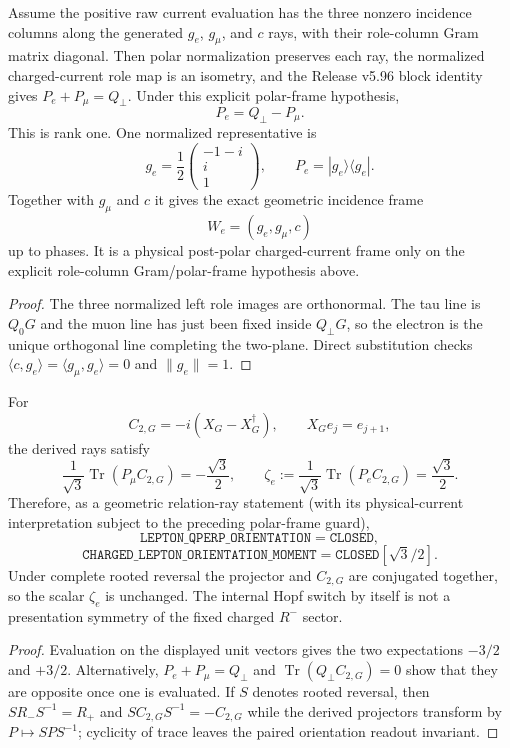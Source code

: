\documentclass[12pt,a4paper]{article}
\begin{document}
\begin{corollary}
\label{p6:cor:v597-electron-plane-ray}
Assume the positive raw current evaluation has the three nonzero incidence
columns along the generated $g_e$, $g_\mu$, and $c$ rays, with their
role-column Gram matrix diagonal. Then polar normalization preserves each
ray, the normalized charged-current role map is an isometry, and the
Release v5.96 block identity gives $P_e+P_\mu=Q_\perp$. Under this
explicit polar-frame hypothesis,
\[
 \boxed{P_e=Q_\perp-P_\mu.}
\]
This is rank one.  One normalized representative is
\[
 \boxed{g_e=\frac12
 \begin{pmatrix}-1-i\\ i\\1\end{pmatrix},
 \qquad P_e=|g_e\rangle\langle g_e|.}
\]
Together with $g_\mu$ and $c$ it gives the exact geometric incidence
frame
\[
 \boxed{W_e=(g_e,g_\mu,c)}
\]
up to phases. It is a physical post-polar charged-current frame only on
the explicit role-column Gram/polar-frame hypothesis above.
\end{corollary}
\begin{proof}
The three normalized left role images are orthonormal.  The tau line is $Q_0G$
and the muon line has just been fixed inside $Q_\perp G$, so the electron is
the unique orthogonal line completing the two-plane.  Direct substitution
checks $\langle c,g_e\rangle=\langle g_\mu,g_e\rangle=0$ and
$\|g_e\|=1$.
\end{proof}

\begin{corollary}
\label{p6:cor:v597-zeta-e-closure}
For
\[
 C_{2,G}=-i(X_G-X_G^\dagger),
 \qquad X_Ge_j=e_{j+1},
\]
the derived rays satisfy
\[
 \frac1{\sqrt3}\operatorname{Tr}(P_\mu C_{2,G})=-\frac{\sqrt3}{2},
 \qquad
 \boxed{\zeta_e:=\frac1{\sqrt3}\operatorname{Tr}(P_eC_{2,G})
 =\frac{\sqrt3}{2}.}
\]
Therefore, as a geometric relation-ray statement (with its physical-current
interpretation subject to the preceding polar-frame guard),
\[
 \boxed{\texttt{LEPTON\_QPERP\_ORIENTATION}=\texttt{CLOSED},}
\]
\[
 \boxed{\texttt{CHARGED\_LEPTON\_ORIENTATION\_MOMENT}
 =\texttt{CLOSED}[\sqrt3/2].}
\]
Under complete rooted reversal the projector and $C_{2,G}$ are conjugated
together, so the scalar $\zeta_e$ is unchanged.  The internal Hopf switch by
itself is not a presentation symmetry of the fixed charged $R^-$ sector.
\end{corollary}
\begin{proof}
Evaluation on the displayed unit vectors gives the two expectations
$-3/2$ and $+3/2$.  Alternatively, $P_e+P_\mu=Q_\perp$ and
$\operatorname{Tr}(Q_\perp C_{2,G})=0$ show that they are opposite once one
is evaluated.  If $S$ denotes rooted reversal, then
$SR_-S^{-1}=R_+$ and $SC_{2,G}S^{-1}=-C_{2,G}$ while the derived projectors
transform by $P\mapsto SPS^{-1}$; cyclicity of trace leaves the paired
orientation readout invariant.
\end{proof}
\end{document}
